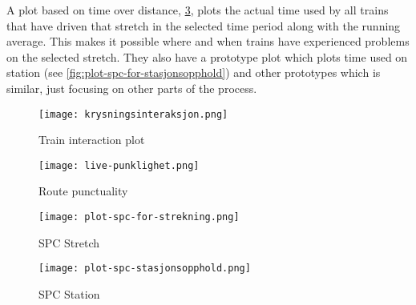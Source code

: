 A plot based on time over distance, \ref{fig:plot-spc-for-strekning}, plots the
actual time used by all trains that have driven that stretch in the selected
time period along with the running average. This makes it possible where and
when trains have experienced problems on the selected stretch. They also have a
prototype plot which plots time used on station (see \vref{fig:plot-spc-for-stasjonsopphold})
and other prototypes which is similar, just focusing on other parts of the
process.  %





\begin{figure}[!htbp]
	\texttt{[image: krysningsinteraksjon.png]}
	\caption[Train interaction plot]{Train interaction plot \cite{sintefPresis}}
	\label{fig:krysningsinteraksjon}
\end{figure}
\pagebreak

\begin{figure}[!htbp]
	\texttt{[image: live-punklighet.png]}
	\caption[Route punctuality]{Route punctuality\cite{sintefPresis}}
	\label{fig:live-punklighet}
\end{figure}
\pagebreak

\begin{figure}[!htbp]
	\texttt{[image: plot-spc-for-strekning.png]}
	\caption[SPC Stretch]{SPC Stretch \cite{sintefPresis}}
	\label{fig:plot-spc-for-strekning}
\end{figure}
\pagebreak

\begin{figure}[!htbp]
	\texttt{[image: plot-spc-stasjonsopphold.png]}
	\caption[SPC Station]{SPC Station \cite{sintefPresis}}
	\label{fig:plot-spc-for-stasjonsopphold}
\end{figure}
\pagebreak

